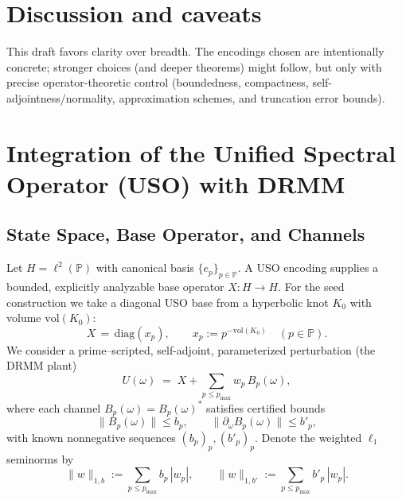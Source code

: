 \documentclass[11pt]{article}
\theoremstyle{definition}
\theoremstyle{remark}
\newcommand{\1}{\mathbf{1}}
\begin{document}
\section{Discussion and caveats}
This draft favors clarity over breadth. The encodings chosen are intentionally concrete; stronger choices (and deeper theorems) might follow, but only with precise operator-theoretic control (boundedness, compactness, self-adjointness/normality, approximation schemes, and truncation error bounds).
\section{Integration of the Unified Spectral Operator (USO) with DRMM}
\label{sec:uso-drmm}

\subsection{State Space, Base Operator, and Channels}
Let $H=\ell^2(\mathbb{P})$ with canonical basis $\{e_p\}_{p\in\mathbb{P}}$. 
A USO encoding supplies a bounded, explicitly analyzable base operator 
$X:\!H\to H$. For the seed construction we take a diagonal USO base from a
hyperbolic knot $K_0$ with volume $\mathrm{vol}(K_0)$:
\[
X \,=\, \mathrm{diag}(x_p),\qquad x_p:=p^{-\mathrm{vol}(K_0)}\quad (p\in\mathbb{P}).
\]
We consider a prime–scripted, self-adjoint, parameterized perturbation (the DRMM plant)
\begin{equation}
\label{eq:plant}
U(\omega)\;=\;X+\sum_{p\le p_{\max}} w_p\,B_p(\omega),
\end{equation}
where each channel $B_p(\omega)=B_p(\omega)^\ast$ satisfies certified bounds
\begin{equation}
\label{eq:channel-bounds}
\|B_p(\omega)\|\le b_p,\qquad \|\partial_\omega B_p(\omega)\|\le b'_p,
\end{equation}
with known nonnegative sequences $(b_p)_{p},(b'_p)_{p}$. Denote the weighted
$\ell_1$ seminorms by
\[
\|w\|_{1,b}:=\sum_{p\le p_{\max}} b_p\,|w_p|,\qquad 
\|w\|_{1,b'}:=\sum_{p\le p_{\max}} b'_p\,|w_p|.
\]
\end{document}
